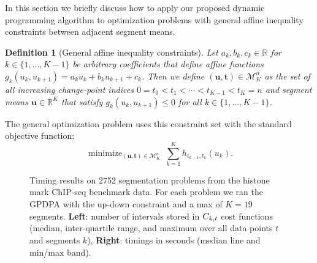 \documentclass{article}
\newtheorem{definition}{Definition}
\DeclareMathOperator*{\minimize}{minimize}
\newcommand{\RR}{\mathbb R}
\begin{document}


In this section we briefly discuss how to apply our proposed dynamic
programming algorithm to optimization problems with general affine
inequality constraints between adjacent segment means.

\begin{definition}[General affine inequality constraints]
\label{def:affine-inequality-constraints}
  Let $a_k,b_k,c_k\in\RR$ for $k\in\{1,\dots,K-1\}$ be arbitrary
  coefficients that define affine functions
  $g_k(u_k, u_{k+1})=a_k u_k + b_k u_{k+1} + c_k$. Then we define
  $(\mathbf u, \mathbf t)\in\mathcal M^n_K$ as the set of all
  increasing change-point indices $0=t_0<t_1<\cdots<t_{K-1}<t_K=n$ and
  segment means $\mathbf u\in\RR^K$ that satisfy
  $g_k(u_k, u_{k+1}) \leq 0$ for all $k\in\{1,\dots, K-1\}$.
\end{definition}
The general optimization problem uses this constraint set with the
standard objective function:
\begin{equation}
  \label{eq:min_general_affine_inequality}
    \minimize_{
        (\mathbf u, \mathbf t)\in\mathcal M^n_K
      } \ 
\sum_{k=1}^K h_{t_{k-1}, t_k}(u_k).
\end{equation}

\begin{figure}[b!]
  \centering
  \parbox{0.49\textwidth}{
    
  }
  \parbox{0.49\textwidth}{
    
  }
  \vskip -0.5cm
  \caption{Timing results on 2752 segmentation problems from the
    histone mark ChIP-seq benchmark data. For each problem we ran the
    GPDPA with the up-down constraint and a max of $K=19$
    segments.  \textbf{Left}: number of intervals stored in
    $C_{k,t}$ cost functions (median, inter-quartile range, and
    maximum over all data points $t$ and segments $k$),
    \textbf{Right}: timings in seconds (median line and min/max
    band).}
  \label{fig:timings}
\end{figure}
\end{document}
